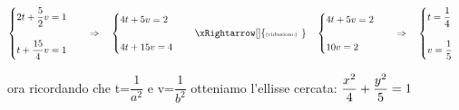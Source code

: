\begin{esempio}
\vspace{6pt}
\(\begin{cases} 2t+\dfrac{5}{2}v =1 \\ \\ t+\dfrac{15}{4}v =1 \end{cases} 
\quad \Rightarrow \quad 
\begin{cases} 4t+5v =2 \\ \\ 4t+15v =4 \end{cases} 
\quad \xRightarrow[]{\text{\tiny (riduzione) \;}} \quad 
\begin{cases}  4t+5v =2 \\ \\ 10v =2 \end{cases}
\quad \Rightarrow \quad   
\begin{cases}  t = \dfrac{1}{4} \\ \\ v =\dfrac{1}{5} \end{cases}
 \)

\vspace{6pt}
ora ricordando che t=\(\dfrac{1}{a^{2}}\) e v=\(\dfrac{1}{b^{2}}\)
otteniamo l'ellisse cercata: 
\( \vspace{2cm} \dfrac{x^{2}}{4} + \dfrac{y^{2}}{5} = 1\)
\end{esempio}

